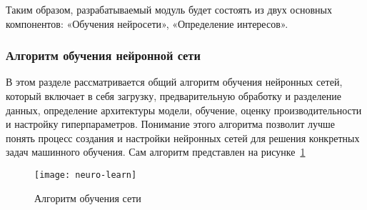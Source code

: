 Таким образом, разрабатываемый модуль будет состоять из двух основных компонентов: «Обучения нейросети», «Определение интересов».




\subsubsection{Алгоритм обучения нейронной сети}

В этом разделе рассматривается общий алгоритм обучения нейронных сетей, который включает в себя загрузку, предварительную обработку и разделение данных, определение архитектуры модели, обучение, оценку производительности и настройку гиперпараметров. Понимание этого алгоритма позволит лучше понять процесс создания и настройки нейронных сетей для решения конкретных задач машинного обучения. Сам алгоритм представлен на рисунке~\ref{f:neuro-learn}

\begin{figure}[h!]
    \centering
    \vspace{\toppaddingoffigure}
    \texttt{[image: neuro-learn]}
    \caption{Алгоритм обучения сети}
    \label{f:neuro-learn}
\end{figure}

